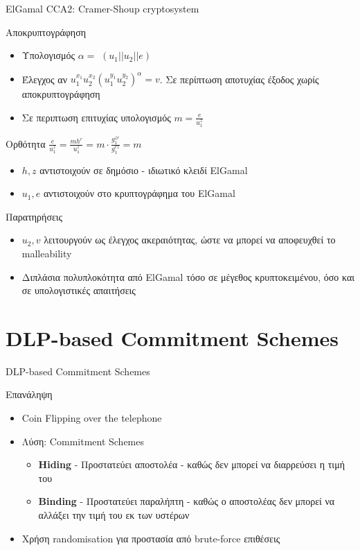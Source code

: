 \documentclass[handout]{beamer}
\begin{document}
\begin{frame}[allowframebreaks]{ElGamal CCA2: Cramer-Shoup cryptosystem}
\framebreak
\begin{block}{Αποκρυπτογράφηση}
\begin{itemize}
\item Υπολογισμός $\alpha = $ \hash$(u_1||u_2||e)$
\item Έλεγχος αν $u_1^{x_1}u_2^{x_2}(u_1^{y_1}u_2^{y_2})^\alpha=v$. Σε περίπτωση αποτυχίας έξοδος χωρίς αποκρυπτογράφηση
\item Σε περιπτωση επιτυχίας υπολογισμός $m = \frac{e}{u_1^z}$
\end{itemize}
\end{block}
\framebreak
\begin{block}{Ορθότητα}
$\frac{e}{u_1^z} = \frac{mh^r}{u_1^z} = m \cdot \frac{g_1^{zr}}{g_1^{rz}} = m$
\begin{itemize}
\item $h,z$ αντιστοιχούν σε δημόσιο - ιδιωτικό κλειδί  ElGamal
\item $u_1, e$ αντιστοιχούν στο κρυπτογράφημα του ElGamal
\end{itemize}
\end{block}

\begin{block}{Παρατηρήσεις}
\begin{itemize}
\item $u_2,v$ λειτουργούν ως έλεγχος ακεραιότητας, ώστε να  μπορεί να αποφευχθεί το malleability 
\item Διπλάσια πολυπλοκότητα από ElGamal τόσο σε μέγεθος κρυπτοκειμένου, όσο και σε υπολογιστικές απαιτήσεις
\end{itemize}
\end{block}
\end{frame}

\section{DLP-based Commitment Schemes}
\begin{frame}{DLP-based Commitment Schemes}
\begin{block}{Επανάληψη}
\begin{itemize}
\item Coin Flipping over the telephone
\pause
\item Λύση:  Commitment Schemes
\pause
\begin{itemize}
\item \textbf{Hiding} - Προστατεύει αποστολέα -  καθώς δεν μπορεί να διαρρεύσει η τιμή του
\pause
\item \textbf{Binding} - Προστατεύει παραλήπτη -  καθώς ο αποστολέας δεν μπορεί να αλλάξει την τιμή του εκ των υστέρων
\pause
\end{itemize}
\item Χρήση randomisation για προστασία από brute-force επιθέσεις
\end{itemize}
\end{block}
\end{frame}
\end{document}
